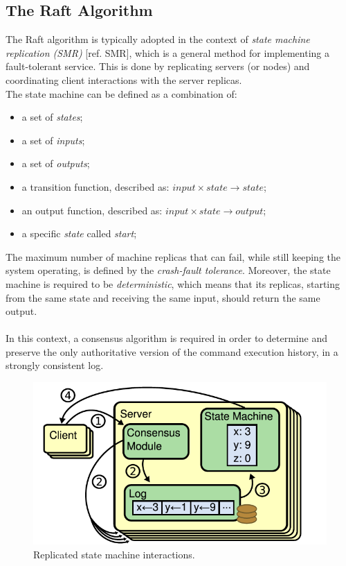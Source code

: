 \subsection{The Raft Algorithm}
The Raft algorithm is typically adopted in the context of \textit{state machine replication (SMR)} [ref. SMR], which is a general method for implementing a fault-tolerant service. This is done by replicating servers (or nodes) and coordinating client interactions with the server replicas. \\
The state machine can be defined as a combination of:
\begin{itemize}
	\item a set of \textit{states};
	\item a set of \textit{inputs};
	\item a set of \textit{outputs};
	\item a transition function, described as: $input \times state \rightarrow state$; 
	\item an output function, described as: $input \times state \rightarrow output$;
	\item a specific \textit{state} called \textit{start};
\end{itemize}
The maximum number of machine replicas that can fail, while still keeping the system operating, is defined by the \textit{crash-fault tolerance}. Moreover, the state machine is required to be \textit{deterministic}, which means that its replicas, starting from the same state and receiving the same input, should return the same output. \\ \\
In this context, a consensus algorithm is required in order to determine and preserve the only authoritative version of the command execution history, in a strongly consistent log.
\begin{figure}[h!]
	\centering
	\includegraphics[width=0.7\linewidth]{"immagini/Technologies/image5.png"}
	\caption{Replicated state machine interactions.}
	\label{fig:states}
\end{figure}
